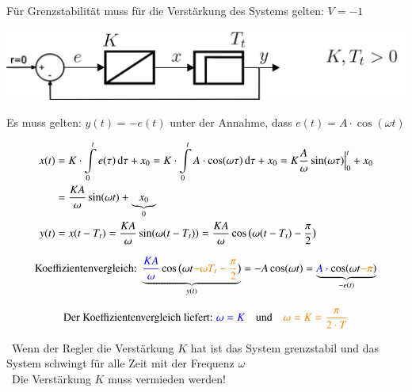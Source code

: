     Für Grenzstabilität muss für die Verstärkung des Systems gelten: $V = -1$ 



    \begin{center}
        \includegraphics[align=center, width=0.75\columnwidth]{images/gegengekoppeltes_system.png}
    \end{center}

    Es muss gelten: $y(t) = -e(t)$ unter der Annahme, dass $e(t) = A \cdot \cos(\omega t)$

    \vspace*{-0.3cm}        %

    \begin{align*}
        x(t) &= K \cdot \int\limits_0^t e(\tau) \mathop{} \! \mathrm{d} \tau + x_0 
            = K \cdot \int\limits_0^t A \cdot \cos(\omega \tau) \mathop{} \! \mathrm{d} \tau + x_0
            = K \frac{A}{\omega} \sin(\omega \tau) \Big|_0^t + x_0 \\
            &= \frac{K A}{\omega} \sin(\omega t) + \underbrace{x_0}_{0} \\
        y(t) &= x(t - T_t) = \frac{K A}{\omega} \sin(\omega (t - T_t)) = \frac{K A}{\omega} \cos \big( \omega( t- T_t) - \frac{\pi}{2}  \big)
    \end{align*}

 

    $$ \text{Koeffizientenvergleich: } \underbrace{ {\color{blue} \frac{K A}{\omega}} \cos \big( \omega t {\color{orange}- \omega T_t - \frac{\pi}{2}}  \big) }_{y(t)}
         = - A \cos(\omega t) = \underbrace{ {\color{blue}A} \cdot \cos(\omega t {\color{orange}- \pi}) }_{-e(t)} $$
    
    $$ \text{Der Koeffizientenvergleich liefert: } {\color{blue}\omega = K} \quad \text{und} \quad {\color{orange}\omega = K = \frac{\pi}{2 \cdot T}} $$

    \textrightarrow\ Wenn der Regler die Verstärkung $K$ hat ist das System grenzstabil 
    und das System schwingt für alle Zeit mit der Frequenz $\omega$\\
    \textrightarrow\ Die Verstärkung $K$ muss vermieden werden!

    